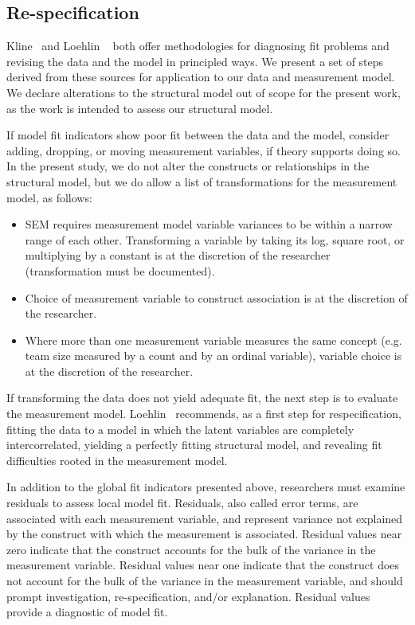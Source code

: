 \subsection{Re-specification}
Kline~\cite{kline2015principles} and Loehlin ~\cite{loehlin2004principles} both offer methodologies for diagnosing fit problems and revising the data and the model in principled ways. We present a set of steps derived from these sources for application to our data and measurement model. We declare alterations to the structural model out of scope for the present work, as the work is intended to assess our structural model. 

If model fit indicators show poor fit between the data and the model, consider adding, dropping, or moving measurement variables, if theory supports doing so. In the present study, we do not alter the constructs or relationships in the structural model, but we do allow a list of transformations for the measurement model, as follows:
\begin{itemize}
	\item SEM requires measurement model variable variances to be within a narrow range of each other. Transforming a variable by taking its log, square root, or multiplying by a constant is at the discretion of the researcher (transformation must be documented).
	\item Choice of measurement variable to construct association is at the discretion of the researcher. 
	\item Where more than one measurement variable measures the same concept (e.g. team size measured by a count and by an ordinal variable), variable choice is at the discretion of the researcher. 
\end{itemize} 

If transforming the data does not yield adequate fit, the next step is to evaluate the measurement model. Loehlin~\cite{loehlin2004latent} recommends, as a first step for respecification,  fitting the data to a model in which the latent variables are completely intercorrelated, yielding a perfectly fitting structural model, and revealing fit difficulties rooted in the measurement model. 

In addition to the global fit indicators presented above, researchers must examine residuals to assess local model fit. Residuals, also called error terms, are associated with each measurement variable, and represent variance not explained by the construct with which the measurement is associated. Residual values near zero indicate that the construct accounts for the bulk of the variance in the measurement variable. Residual values near one indicate that the construct does not account for the bulk of the variance in the measurement variable, and should prompt investigation, re-specification, and/or explanation. Residual values provide a diagnostic of model fit.

